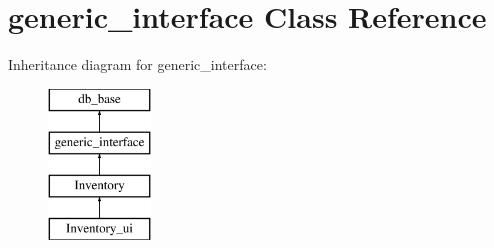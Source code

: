 \hypertarget{classgeneric__interface}{}\section{generic\+\_\+interface Class Reference}
\label{classgeneric__interface}
Inheritance diagram for generic\+\_\+interface\+:\begin{figure}[H]
\begin{center}
\leavevmode
\includegraphics[height=4.000000cm]{dc/d4e/classgeneric__interface}
\end{center}
\end{figure}
